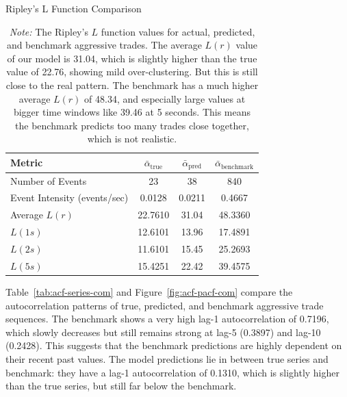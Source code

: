 \begin{table}[H]
    \centering
    \caption{Ripley's L Function Comparison} 
    \caption*{\textit{Note:} The Ripley's \(L\) function values for actual, predicted, and benchmark aggressive trades. The average \(L(r)\) value of our model is 31.04, which is slightly higher than the true value of 22.76, showing mild over-clustering. But this is still close to the real pattern. The benchmark has a much higher average \(L(r)\) of 48.34, and especially large values at bigger time windows like 39.46 at 5 seconds. This means the benchmark predicts too many trades close together, which is not realistic.}

    \begin{tabular}{lccc}
    \toprule
    \textbf{Metric} & $\bar{\alpha}_\text{true}$ & $\bar{\alpha}_\text{pred}$ & $\bar{\alpha}_\text{benchmark}$ \\
    \midrule
    Number of Events & 23 & 38 & 840 \\
    Event Intensity (events/sec) & 0.0128 & 0.0211 & 0.4667 \\
    Average \( L(r) \) & 22.7610 & 31.04 & 48.3360 \\
    \( L(1s) \) & 12.6101 & 13.96 & 17.4891\\
    \( L(2s) \) & 11.6101 & 15.45 & 25.2693\\
    \( L(5s) \) & 15.4251 & 22.42 & 39.4575\\
    \bottomrule
    \end{tabular}
    \label{tb:ripley-l_com}
\end{table}

Table~\ref{tab:acf-series-com} and Figure~\ref{fig:acf-pacf-com} compare the autocorrelation patterns of true, predicted, and benchmark aggressive trade sequences. The benchmark shows a very high lag-1 autocorrelation of 0.7196, which slowly decreases but still remains strong at lag-5 (0.3897) and lag-10 (0.2428). This suggests that the benchmark predictions are highly dependent on their recent past values. The model predictions lie in between true series and benchmark: they have a lag-1 autocorrelation of 0.1310, which is slightly higher than the true series, but still far below the benchmark. 

